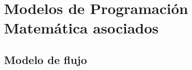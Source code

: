 \documentclass[aspectratio=169]{beamer}
\begin{document}

\section{Modelos de Programación Matem\'atica asociados}

\subsection{Modelo de flujo}
\end{document}
